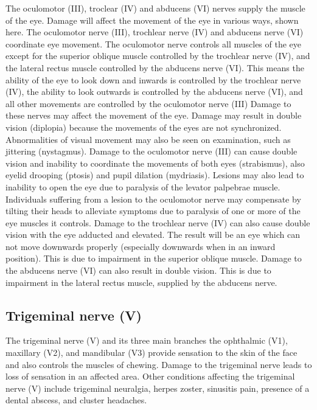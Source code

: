 The oculomotor (III), troclear (IV) and abducens (VI) nerves supply the muscle of the eye. Damage will affect the movement of the eye in various ways, shown here. The oculomotor nerve (III), trochlear nerve (IV) and abducens nerve (VI) coordinate eye movement. The oculomotor nerve controls all muscles of the eye except for the superior oblique muscle controlled by the trochlear nerve (IV), and the lateral rectus muscle controlled by the abducens nerve (VI). This means the ability of the eye to look down and inwards is controlled by the trochlear nerve (IV), the ability to look outwards is controlled by the abducens nerve (VI), and all other movements are controlled by the oculomotor nerve (III) Damage to these nerves may affect the movement of the eye. Damage may result in double vision (diplopia) because the movements of the eyes are not synchronized. Abnormalities of visual movement may also be seen on examination, such as jittering (nystagmus). Damage to the oculomotor nerve (III) can cause double vision and inability to coordinate the movements of both eyes (strabismus), also eyelid drooping (ptosis) and pupil dilation (mydriasis). Lesions may also lead to inability to open the eye due to paralysis of the levator palpebrae muscle. Individuals suffering from a lesion to the oculomotor nerve may compensate by tilting their heads to alleviate symptoms due to paralysis of one or more of the eye muscles it controls.
Damage to the trochlear nerve (IV) can also cause double vision with the eye adducted and elevated. The result will be an eye which can not move downwards properly (especially downwards when in an inward position). This is due to impairment in the superior oblique muscle. Damage to the abducens nerve (VI) can also result in double vision. This is due to impairment in the lateral rectus muscle, supplied by the abducens nerve.

\hypertarget{trigeminal-nerve-v}{%
\subsection{Trigeminal nerve (V)}\label{trigeminal-nerve-v}}

The trigeminal nerve (V) and its three main branches the ophthalmic (V1), maxillary (V2), and mandibular (V3) provide sensation to the skin of the face and also controls the muscles of chewing. Damage to the trigeminal nerve leads to loss of sensation in an affected area. Other conditions affecting the trigeminal nerve (V) include trigeminal neuralgia, herpes zoster, sinusitis pain, presence of a dental abscess, and cluster headaches.

